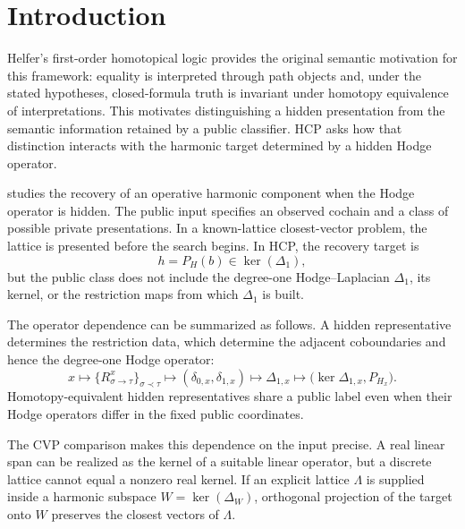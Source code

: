 \section*{Introduction}


Helfer's first-order homotopical logic \cite{helfer2019fol} provides the
original semantic motivation for this framework: equality is interpreted
through path objects and, under the stated hypotheses, closed-formula truth
is invariant under homotopy equivalence of interpretations. This motivates
distinguishing a hidden presentation from the semantic information retained
by a public classifier. HCP asks how that distinction interacts with the
harmonic target determined by a hidden Hodge operator.

\HE{} studies the recovery of an operative harmonic component when the
Hodge operator is hidden. The public input specifies an observed cochain and
a class of possible private presentations. In a known-lattice closest-vector
problem, the lattice is presented before the search begins. In HCP, the
recovery target is
\[
  h=P_H(b)\in\ker(\Delta_1),
\]
but the public class does not include the degree-one Hodge--Laplacian
\(\Delta_1\), its kernel, or the restriction maps from which \(\Delta_1\) is
built.

The operator dependence can be summarized as follows. A hidden representative
determines the restriction data, which determine the adjacent
coboundaries and hence the degree-one Hodge operator:
\[
  x
  \longmapsto
  \{R_{\sigma\to\tau}^{x}\}_{\sigma\prec\tau}
  \longmapsto
  (\delta_{0,x},\delta_{1,x})
  \longmapsto
  \Delta_{1,x}
  \longmapsto
  \bigl(\ker\Delta_{1,x},P_{H_x}\bigr).
\]
Homotopy-equivalent hidden representatives share a public label even when
their Hodge operators differ in the fixed public coordinates.

The CVP comparison makes this dependence on the input precise. A real linear
span can be realized as the kernel of a suitable linear operator, but a discrete lattice cannot equal a
nonzero real kernel. If an explicit lattice \(\Lambda\) is supplied inside a
harmonic subspace \(W=\ker(\Delta_W)\), orthogonal projection of the target
onto \(W\) preserves the closest vectors of \(\Lambda\).

